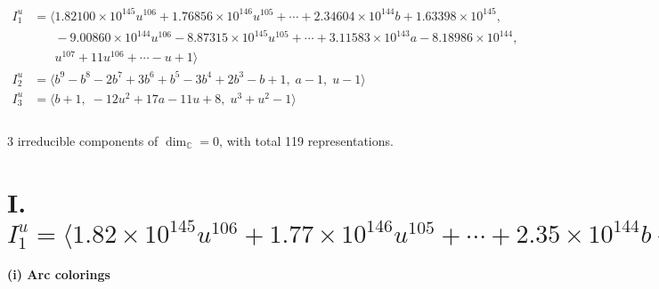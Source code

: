 \documentclass[1p]{elsarticle_modified}
\theoremstyle{definition}
\begin{document}
\begin{align*}
I^u_{1}&=\langle 
1.82100\times10^{145} u^{106}+1.76856\times10^{146} u^{105}+\cdots+2.34604\times10^{144} b+1.63398\times10^{145},\\
\phantom{I^u_{1}}&\phantom{= \langle  }-9.00860\times10^{144} u^{106}-8.87315\times10^{145} u^{105}+\cdots+3.11583\times10^{143} a-8.18986\times10^{144},\\
\phantom{I^u_{1}}&\phantom{= \langle  }u^{107}+11 u^{106}+\cdots- u+1\rangle \\
I^u_{2}&=\langle 
b^9- b^8-2 b^7+3 b^6+b^5-3 b^4+2 b^3- b+1,\;a-1,\;u-1\rangle \\
I^u_{3}&=\langle 
b+1,\;-12 u^2+17 a-11 u+8,\;u^3+u^2-1\rangle \\
\\
\end{align*}
\raggedright * 3 irreducible components of $\dim_{\mathbb{C}}=0$, with total 119 representations.\\
\newpage
\renewcommand{\arraystretch}{1}
\centering \section*{I. $I^u_{1}= \langle 1.82\times10^{145} u^{106}+1.77\times10^{146} u^{105}+\cdots+2.35\times10^{144} b+1.63\times10^{145},\;-9.01\times10^{144} u^{106}-8.87\times10^{145} u^{105}+\cdots+3.12\times10^{143} a-8.19\times10^{144},\;u^{107}+11 u^{106}+\cdots- u+1 \rangle$}
\flushleft \textbf{(i) Arc colorings}\\
\end{document}
